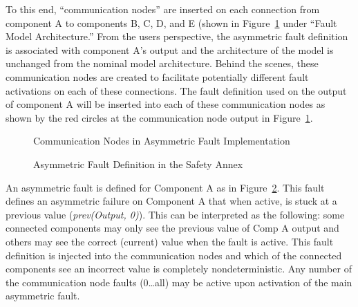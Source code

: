 To this end, ``communication nodes'' are inserted on each connection from component A to components B, C, D, and E (shown in Figure~\ref{fig:commNodes} under ``Fault Model Architecture.'' From the users perspective, the asymmetric fault definition is associated with component A's output and the architecture of the model is unchanged from the nominal model architecture. Behind the scenes, these communication nodes are created to facilitate potentially different fault activations on each of these connections. The fault definition used on the output of component A will be inserted into each of these communication nodes as shown by the red circles at the communication node output in Figure~\ref{fig:commNodes}.
\begin{figure}[!htb]
        \caption{\label{fig:commNodes} Communication Nodes in Asymmetric Fault Implementation}
\end{figure}

\begin{figure}[!htb]
        \caption{\label{fig:asymFaultDef} Asymmetric Fault Definition in the Safety Annex}
\end{figure}

An asymmetric fault is defined for Component A as in Figure~\ref{fig:asymFaultDef}. This fault defines an asymmetric failure on Component A that when active, is stuck at a previous value (\textit{prev(Output, 0)}). This can be interpreted as the following: some connected components may only see the previous value of Comp A output and others may see the correct (current) value when the fault is active. This fault definition is injected into the communication nodes and which of the connected components see an incorrect value is completely nondeterministic. Any number of the communication node faults (0…all) may be active upon activation of the main asymmetric fault.

